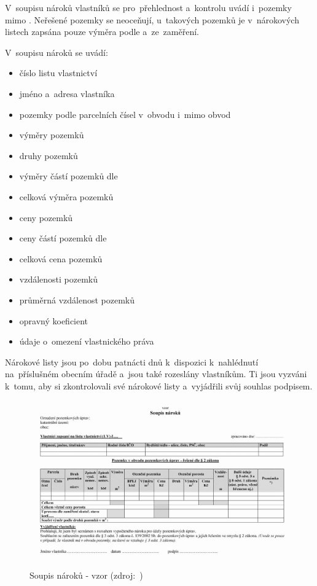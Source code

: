 V~soupisu nároků vlastníků se pro~přehlednost a~kontrolu uvádí
i~pozemky mimo . Neřešené pozemky se neoceňují, u~takových
pozemků je v~nárokových listech zapsána pouze výměra podle 
a~ze~zaměření.

V~soupisu nároků se uvádí: \vspace{-\topsep}
	\begin{itemize}[leftmargin=1.5cm, noitemsep]
		\item číslo listu vlastnictví
		\item jméno a~adresa vlastníka
		\item pozemky podle parcelních čísel v~obvodu i~mimo
obvod 
		\item výměry pozemků
		\item druhy pozemků
		\item výměry částí pozemků dle 
		\item celková výměra pozemků
		\item ceny pozemků
		\item ceny částí pozemků dle 
		\item celková cena pozemků
		\item vzdálenosti pozemků
		\item průměrná vzdálenost pozemků
		\item opravný koeficient
		\item údaje o~omezení vlastnického práva
	\end{itemize}

Nárokové listy jsou po~dobu patnácti dnů k~dispozici k~nahlédnutí
na~příslušném obecním úřadě a~jsou také rozeslány vlastníkům. Ti jsou
vyzváni k~tomu, aby si zkontrolovali své nárokové listy a~vyjádřili
svůj souhlas podpisem.
 	
	\begin{figure}[H] \centering
		\includegraphics[width=.9\textwidth]{./pictures/soupis_naroku.png}
		\caption[Soupis nároků - vzor]{Soupis nároků - vzor
(zdroj:~\citep{vyhlaska_13})}
		\label{fig:soupis_naroku}
 	\end{figure}

